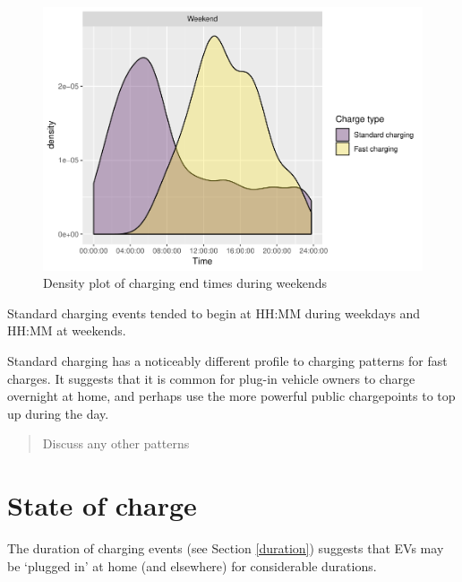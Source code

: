 \documentclass[]{article}
\begin{document}
\begin{figure}
\centering
\includegraphics{EVBB_SummaryReport_files/figure-latex/chargeEndsWeekend-1.pdf}
\caption{\label{fig:chargeEndsWeekend}Density plot of charging end times
during weekends}
\end{figure}

Standard charging events tended to begin at HH:MM during weekdays and
HH:MM at weekends.

Standard charging has a noticeably different profile to charging
patterns for fast charges. It suggests that it is common for plug-in
vehicle owners to charge overnight at home, and perhaps use the more
powerful public chargepoints to top up during the day.

\begin{quote}
Discuss any other patterns
\end{quote}

\section{State of charge}\label{state-of-charge}

The duration of charging events (see Section \ref{duration}) suggests
that EVs may be `plugged in' at home (and elsewhere) for considerable
durations.
\end{document}
